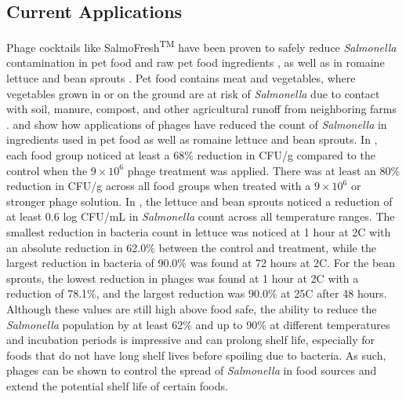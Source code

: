 \subsection{Current Applications}
Phage cocktails like SalmoFresh\textsuperscript{TM} have been proven to safely reduce \textit{Salmonella} contamination in pet food and raw pet food ingredients \cite{sofferBacteriophagesSafelyReduce2016}, as well as in romaine lettuce and bean sprouts \cite{zhangSalmoFreshEffectivenessControlling2019}.
Pet food contains meat and vegetables, where vegetables grown in or on the ground are at risk of \textit{Salmonella} due to contact with soil, manure, compost, and other agricultural runoff from neighboring farms \cite{kowalskaFreshVegetablesFruit2023}.
 \cite{sofferBacteriophagesSafelyReduce2016} and  \cite{zhangSalmoFreshEffectivenessControlling2019} show how applications of phages have reduced the count of \textit{Salmonella} in ingredients used in pet food as well as romaine lettuce and bean sprouts. 
In , each food group noticed at least a 68\% reduction in CFU/g compared to the control when the $9\times 10^6$ phage treatment was applied. 
There was at least an 80\% reduction in CFU/g across all food groups when treated with a $9\times 10^6$ or stronger phage solution. 
In , the lettuce and bean sprouts noticed a reduction of at least 0.6 log CFU/mL in \textit{Salmonella} count across all temperature ranges. 
The smallest reduction in bacteria count in lettuce was noticed at 1 hour at 2\textdegree C with an absolute reduction in 62.0\% between the control and treatment, while the largest reduction in bacteria of 90.0\% was found at 72 hours at 2\textdegree C. 
For the bean sprouts, the lowest reduction in phages was found at 1 hour at 2\textdegree C with a reduction of 78.1\%, and the largest reduction was 90.0\% at 25\textdegree C after 48 hours. 
Although these values are still high above food safe, the ability to reduce the \textit{Salmonella} population by at least 62\% and up to 90\% at different temperatures and incubation periods is impressive and can prolong shelf life, especially for foods that do not have long shelf lives before spoiling due to bacteria. 
As such, phages can be shown to control the spread of \textit{Salmonella} in food sources and extend the potential shelf life of certain foods. 


